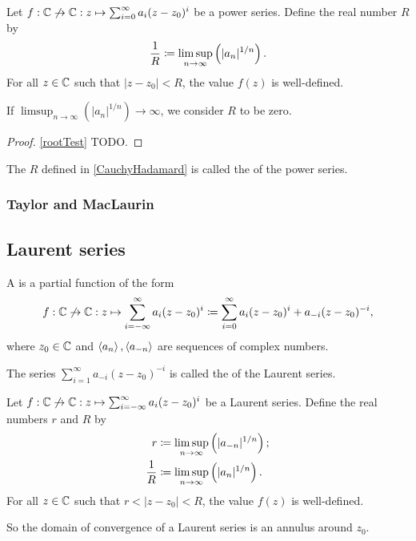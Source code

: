 \begin{proposition} \label{CauchyHadamard}
Let $f: \mathbb{C}\not\to \mathbb{C}: z\mapsto \sum_{i=0}^\infty a_i(z-z_0)^i$ be a power series. Define the real number $R$ by
\[ \frac{1}{R} \coloneqq \limsup_{n\to\infty}\left(|a_n|^{1/n}\right). \]
For all $z\in \mathbb{C}$ such that $|z-z_0| < R$, the value $f(z)$ is well-defined.
\end{proposition}
If $\limsup_{n\to\infty}\left(|a_n|^{1/n}\right) \to \infty$, we consider $R$ to be zero.
\begin{proof}
\ref{rootTest} TODO.
\end{proof} 

\begin{definition}
The $R$ defined in \ref{CauchyHadamard} is called the  of the power series.
\end{definition}

\subsubsection{Taylor and MacLaurin}
\subsection{Laurent series}
\begin{definition}
A  is a partial function of the form
\[ f: \mathbb{C}\not\to \mathbb{C}: z\mapsto \sum_{i=-\infty}^\infty a_i(z-z_0)^i \coloneqq \sum_{i=0}^\infty a_i(z-z_0)^i + a_{-i}(z-z_0)^{-i}, \]
where $z_0\in \mathbb{C}$ and $\left\langle a_n \right\rangle, \left\langle a_{-n} \right\rangle$ are sequences of complex numbers.

The series $\sum_{i=1}^\infty a_{-i}(z-z_0)^{-i}$ is called the  of the Laurent series.
\end{definition}

\begin{proposition} \label{LaurentSeriesConvergence}
Let $f: \mathbb{C}\not\to \mathbb{C}: z\mapsto \sum_{i=-\infty}^\infty a_i(z-z_0)^i$ be a Laurent series. Define the real numbers $r$ and $R$ by
\begin{align*}
r &\coloneqq \limsup_{n\to\infty}\left(|a_{-n}|^{1/n}\right); \\
\frac{1}{R} &\coloneqq \limsup_{n\to\infty}\left(|a_n|^{1/n}\right).
\end{align*}
For all $z\in \mathbb{C}$ such that $r < |z-z_0| < R$, the value $f(z)$ is well-defined.
\end{proposition}
So the domain of convergence of a Laurent series is an annulus around $z_0$.

